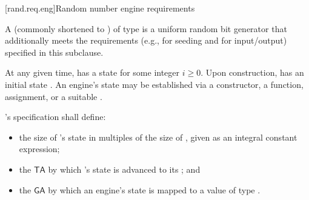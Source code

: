 
[rand.req.eng]{Random number engine requirements}%
%

\pnum
A 
(commonly shortened to )
 of type 
is a uniform random bit generator
that additionally meets the requirements
(e.g., for seeding and for input/output)
specified in this subclause.

\pnum
At any given time,
 has a state 
for some integer $i \geq 0$.
Upon construction,
has an initial state .
An engine's state may be established via
 a constructor,
 a  function,
 assignment,
 or a suitable .

\pnum
{}'s specification shall define:
\begin{itemize}
 \item
   the size of 's state
   in multiples of the size of ,
   given as an integral constant expression;
 \item
   the 
   $\mathsf{TA}$
   by which 's state 
   is advanced to its 
   ;
 and
 \item
   the 
   $\mathsf{GA}$
   by which an engine's state is mapped
   to a value of type .
\end{itemize}

